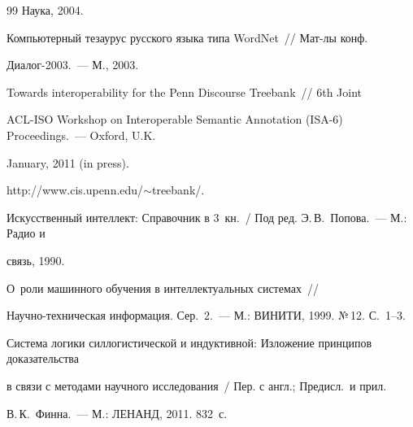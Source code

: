 {{\begin{thebibliography}{99}
Наука, 2004.









Компьютерный тезаурус русского языка типа WordNet~/\!\!/ Мат-лы конф.\ 


Диалог-2003.~--- М., 2003.












Towards interoperability for the Penn Discourse Treebank~/\!\!/ 6th Joint 


ACL-ISO Workshop on Interoperable Semantic Annotation (ISA-6) Proceedings.~--- Oxford, U.K. 


January, 2011 (in press).







{\sf http://www.cis.upenn.edu/$\sim$treebank/}.







Искусственный интеллект: Справочник в 3~кн.~/ Под ред. Э.\,В.~Попова.~--- М.: Радио и 


связь, 1990.







 О~роли машинного обучения в интеллектуальных системах~/\!\!/ 


Научно-техническая информация. Сер.~2.~--- М.: ВИНИТИ, 1999.  №\,12. С.~1--3.









Система логики силлогистической и индуктивной: Изложение принципов доказательства 


в связи с методами научного исследования~/ Пер. с англ.; Предисл.\ и прил.\ 


В.\,К.~Финна.~--- М.: ЛЕНАНД, 2011.  832~с. 






\end{thebibliography}}}

